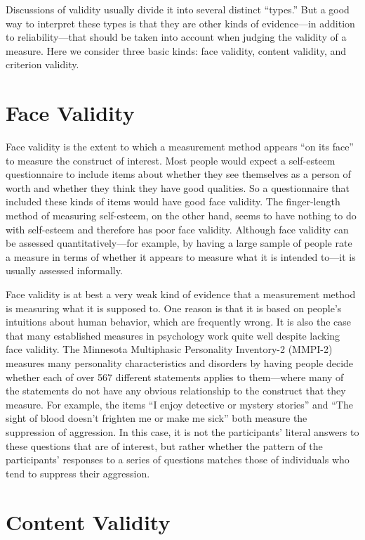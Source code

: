 \documentclass[]{book}
\theoremstyle{definition}
\theoremstyle{definition}
\theoremstyle{remark}
\begin{document}
Discussions of validity usually divide it into several distinct
``types.'' But a good way to interpret these types is that they are
other kinds of evidence---in addition to reliability---that should be
taken into account when judging the validity of a measure. Here we
consider three basic kinds: face validity, content validity, and
criterion validity.

\section{Face Validity}\label{face-validity}

Face validity is the extent to which a measurement method appears ``on
its face'' to measure the construct of interest. Most people would
expect a self-esteem questionnaire to include items about whether they
see themselves as a person of worth and whether they think they have
good qualities. So a questionnaire that included these kinds of items
would have good face validity. The finger-length method of measuring
self-esteem, on the other hand, seems to have nothing to do with
self-esteem and therefore has poor face validity. Although face validity
can be assessed quantitatively---for example, by having a large sample
of people rate a measure in terms of whether it appears to measure what
it is intended to---it is usually assessed informally.

Face validity is at best a very weak kind of evidence that a measurement
method is measuring what it is supposed to. One reason is that it is
based on people's intuitions about human behavior, which are frequently
wrong. It is also the case that many established measures in psychology
work quite well despite lacking face validity. The Minnesota Multiphasic
Personality Inventory-2 (MMPI-2) measures many personality
characteristics and disorders by having people decide whether each of
over 567 different statements applies to them---where many of the
statements do not have any obvious relationship to the construct that
they measure. For example, the items ``I enjoy detective or mystery
stories'' and ``The sight of blood doesn't frighten me or make me sick''
both measure the suppression of aggression. In this case, it is not the
participants' literal answers to these questions that are of interest,
but rather whether the pattern of the participants' responses to a
series of questions matches those of individuals who tend to suppress
their aggression.

\section{Content Validity}\label{content-validity}
\end{document}

